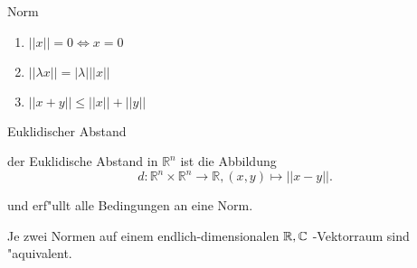 \documentclass[class=article, crop=false]{standalone}
\begin{document}
\begin{zettel}{Norm}

\begin{flashcard}[]{}
	\begin{definition}[Norm]
		\begin{enumerate}
			\item $ ||x|| = 0 \iff x = 0$
			\item $ ||\lambda x|| = |\lambda| ||x||$
			\item $ ||x + y|| \leq  ||x|| + ||y||$
		\end{enumerate}
	\end{definition}
\end{flashcard}

\begin{flashcard}[]{}
	\begin{question}
		Euklidischer Abstand
	\end{question}
	\begin{definition}
		der Euklidische Abstand in $\mathbb{R}^n $ ist die Abbildung
		\[
			d: \mathbb{R}^n \times \mathbb{R}^n \longrightarrow  \mathbb{R}, (x,y) \mapsto ||x-y||
		.\]
	\end{definition}
	und erf"ullt alle Bedingungen an eine Norm.
\end{flashcard}

\begin{theorem}
	Je zwei Normen auf einem endlich-dimensionalen $\mathbb{R},\mathbb{C} $ -Vektorraum sind "aquivalent.
\end{theorem}

\end{zettel}
\end{document}

